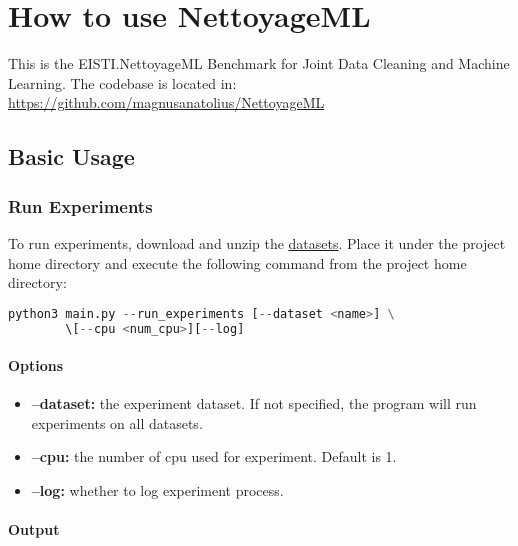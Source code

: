 \chapter{How to use NettoyageML} 

\begin{flushleft}
	This is the EISTI.NettoyageML Benchmark for Joint Data Cleaning and Machine Learning. 
	The codebase is located in: \url{https://github.com/magnusanatolius/NettoyageML}
\end{flushleft}

\section{Basic Usage}

\subsection*{Run Experiments}

\begin{flushleft}
	To run experiments, download and unzip the 
	\href{https://drive.google.com/file/d/1BdLZAyp5KSvj8AdL2by9bNkRxX8po1FL/view?usp=sharing}{datasets}. 
	Place it under the project home directory and execute the following command from the project home directory:
\end{flushleft}


\begin{lstlisting}[language=python]
		python3 main.py --run_experiments [--dataset <name>] \
		\[--cpu <num_cpu>][--log]
\end{lstlisting}

\subsubsection*{Options}

\begin{itemize}
	\item {
		\textbf{--dataset:} the experiment dataset. If not specified, the program will run experiments on all datasets.
	}
	\item {
		\textbf{--cpu:} the number of cpu used for experiment. Default is 1.
	}
	\item {
	\textbf{--log:} whether to log experiment process.
	}
\end{itemize}


\subsubsection*{Output}

